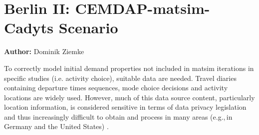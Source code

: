\section{Berlin II: CEMDAP-\protect\gls{matsim}-Cadyts Scenario}
\label{sec:berlinII}
\hfill \textbf{Author:} Dominik Ziemke


%
To correctly model initial demand properties not included in \gls{matsim} iterations in specific studies (i.e. activity choice), suitable data are needed. Travel diaries containing departure times sequences, mode choice decisions and activity locations are widely used.
%
However, much of this data source content, particularly location information, is considered sensitive in terms of data privacy legislation and thus increasingly difficult to obtain and process in many areas (e.g.,\,in Germany and the United States) \citep{ZiemkeNagelBhat2015IntegratingCemdapMatsimTransferabilityTRB}.

